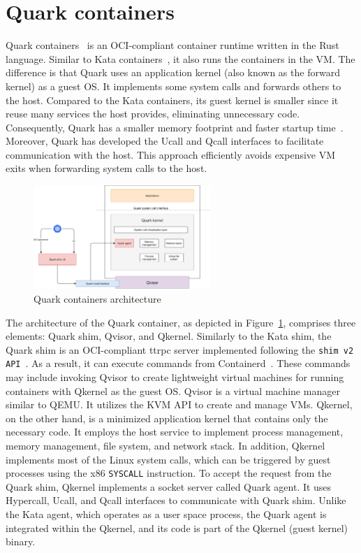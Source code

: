 \section{Quark containers}
\label{sec:Quark}
Quark containers~\cite*{quark} is an OCI-compliant container runtime written in the Rust language. Similar to Kata containers~\cite*{Kata-Containers}, it also runs the containers in the VM. 
The difference is that Quark uses an application kernel (also known as the forward kernel) as a guest OS. It implements some system calls and forwards others to the host. Compared to the Kata containers, its guest kernel is smaller since it reuse many services the host provides, eliminating unnecessary code.
Consequently, Quark has a smaller memory footprint and faster startup time~\cite*{quark_performance_report}. Moreover, Quark has developed the Ucall and Qcall interfaces to facilitate communication with the host. This approach efficiently avoids expensive VM exits when 
forwarding system calls to the host.

\begin{figure}[htp]
  \centering
  \includegraphics[width=0.6\textwidth]{images/QUARK_ARCH.PNG}
  \caption[Quark containers architecture]{Quark containers architecture}
  \label{fig:QUARK_ARCH}
\end{figure}


The architecture of the Quark container, as depicted in Figure~\ref{fig:QUARK_ARCH}, comprises three elements: Quark shim, Qvisor, and Qkernel. Similarly to the Kata shim, the Quark shim is an OCI-compliant ttrpc server implemented following the \texttt{shim v2 API}~\cite*{shim_v2}. As a 
result, it can execute commands from Containerd~\cite*{containerd}. These commands may include invoking Qvisor to create lightweight virtual machines for running containers with Qkernel as the guest OS. Qvisor is a virtual machine manager similar to QEMU. It utilizes the KVM API to create and 
manage VMs. Qkernel, on the other hand, is a minimized application kernel that contains only the necessary code. It employs the host service to implement process management, memory management, file system, and network stack. 
In addition, Qkernel implements most of the Linux system calls, which can be triggered by guest processes using the x86 \texttt{SYSCALL} instruction. To accept the request from the Quark shim, Qkernel implements a socket server called Quark agent. It uses Hypercall, Ucall, and Qcall interfaces to 
communicate with Quark shim. Unlike the Kata agent, which operates as a user space process, the Quark agent is integrated within the Qkernel, and its code is part of the Qkernel (guest kernel) binary.



